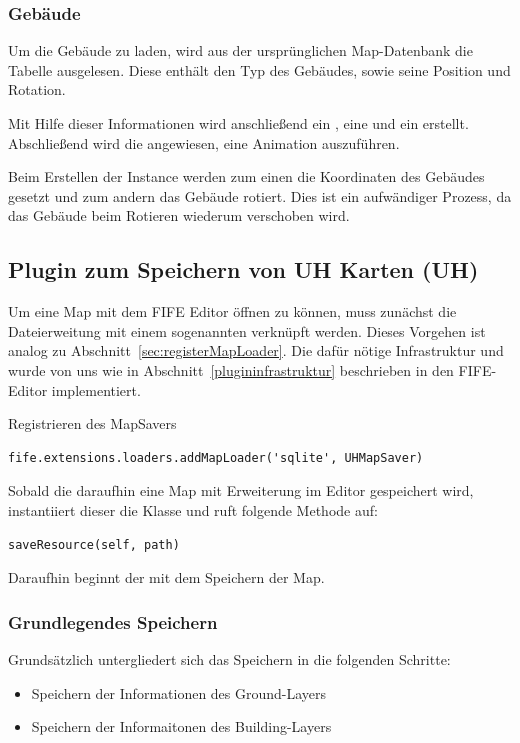 \subsubsection{Gebäude}
Um die Gebäude zu laden, wird aus der ursprünglichen Map-Datenbank
die Tabelle  ausgelesen. Diese enthält den Typ des Gebäudes,
sowie seine Position und Rotation.

Mit Hilfe dieser Informationen wird anschließend ein , eine
 und ein  erstellt. Abschließend
wird die  angewiesen, eine Animation auszuführen.

Beim Erstellen der Instance werden zum einen die Koordinaten des Gebäudes
gesetzt und zum andern das Gebäude rotiert. Dies ist ein aufwändiger
Prozess, da das Gebäude beim Rotieren wiederum verschoben wird.


\subsection{Plugin zum Speichern von UH Karten (UH)}
Um eine Map mit dem FIFE Editor öffnen zu können, muss
zunächst die Dateierweitung mit einem sogenannten  verknüpft
werden. Dieses Vorgehen ist analog zu Abschnitt~\ref{sec:registerMapLoader}. Die
dafür nötige Infrastruktur und wurde von uns wie in
Abschnitt~\ref{plugininfrastruktur} beschrieben in den FIFE-Editor
implementiert.

Registrieren des MapSavers

\begin{lstlisting}
fife.extensions.loaders.addMapLoader('sqlite', UHMapSaver)
\end{lstlisting}

Sobald die daraufhin eine Map mit  Erweiterung im Editor
gespeichert wird, instantiiert dieser die  Klasse und ruft
folgende Methode auf:

\begin{lstlisting}
saveResource(self, path)
\end{lstlisting}

Daraufhin beginnt der  mit dem Speichern der Map.

\subsubsection{Grundlegendes Speichern}
Grundsätzlich untergliedert sich das Speichern in die folgenden Schritte:
\begin{itemize}
  \item Speichern der Informationen des Ground-Layers
  \item Speichern der Informaitonen des Building-Layers
\end{itemize}

